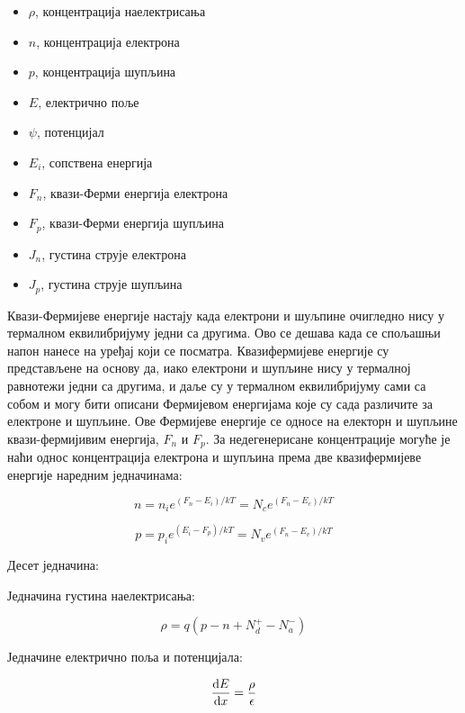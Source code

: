 \documentclass{article}
\begin{document}
 \begin{itemize}
	\item $\rho$, концентрација наелектрисања
	\item $n$, концентрација електрона
	\item $p$, концентрација шупљина
	\item $E$, електрично поље
	\item $\psi$, потенцијал
	\item $E_i$, сопствена енергија
	\item $F_n$, квази-Ферми енергија електрона
	\item $F_p$, квази-Ферми енергија шупљина
	\item $J_n$, густина струје електрона
	\item $J_p$, густина струје шупљина
 \end{itemize}

\begin{info}
	Квази-Фермијеве енергије настају када електрони и шуљпине очигледно нису у термалном еквилибријуму једни са другима. Ово се дешава када се спољашњи напон нанесе на уређај који се посматра. Квазифермијеве енергије су представљене на основу да, иако електрони и шупљине нису у термалној равнотежи једни са другима, и даље су у термалном еквилибријуму сами са собом и могу бити описани Фермијевом енергијама које су сада различите за електроне и шупљине. Ове Фермијеве енергије се односе на електорн и шупљине квази-фермијивим енергија, $F_n$ и $F_p$. За недегенерисане концентрације могуће је наћи однос концентрација електрона и шупљина према две квазифермијеве енергије наредним једначинама:
\end{info}

\begin{equation*} 
	n = n_i e^{(F_n - E_i)/kT} = N_c e^{(F_n - E_c)/kT}
\end{equation*}

\begin{equation*} 
	p = p_i e^{(E_i - F_p)/kT} = N_v e^{(F_n - E_v)/kT}
\end{equation*}

Десет једначина:

Једначина густина наелектрисања:

\begin{equation*}
	\rho = q(p-n + N_d^+ - N_a^-)	
\end{equation*}


Једначине електрично поља и потенцијала:

\begin{equation*}
	\dv{E}{x} =  \dfrac{\rho}{\epsilon}
\end{equation*}
\end{document}
